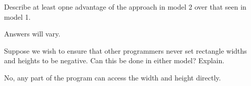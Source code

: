   \Q Describe at least opne advantage of the approach in
    model 2 over that seen in\key\\[-2.5mm] model 1.
    \begin{answer}[0.5in]
       Answers will vary.
    \end{answer}
    
  \Q Suppose we wish to ensure that other programmers never set
    rectangle widths and heights to be negative. Can this be done in
    either model?  Explain.
    \begin{answer}[0.5in]
      No, any part of the program can access the width and height
      directly.
    \end{answer}
